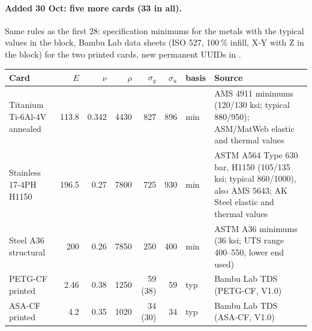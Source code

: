 \paragraph{Added 30 Oct: five more cards (33 in all).} Same rules as the first 28: specification minimums for the
metals with the typical values in the  block, Bambu Lab data sheets (ISO 527, 100\,\% infill, X-Y with
Z in the block) for the two printed cards, new permanent UUIDs in .

\begin{center}
\scriptsize
\begin{tabularx}{\linewidth}{@{}>{\raggedright\arraybackslash}p{2.75cm}rrrrrlX@{}}
\toprule
Card & $E$ & $\nu$ & $\rho$ & $\sigma_y$ & $\sigma_u$ & basis & Source\\
\midrule
Titanium Ti-6Al-4V annealed & 113.8 & 0.342 & 4430 & 827 & 896 & min & AMS 4911 minimums (120/130 ksi; typical 880/950); ASM/MatWeb elastic and thermal values\\
Stainless 17-4PH H1150 & 196.5 & 0.27 & 7800 & 725 & 930 & min & ASTM A564 Type 630 bar, H1150 (105/135 ksi; typical 860/1000), also AMS 5643; AK Steel elastic and thermal values\\
Steel A36 structural & 200 & 0.26 & 7850 & 250 & 400 & min & ASTM A36 minimums (36 ksi; UTS range 400--550, lower end used)\\
PETG-CF printed & 2.46 & 0.38 & 1250 & 59 (38) & 59 & typ & Bambu Lab TDS (PETG-CF, V1.0)\\
ASA-CF printed & 4.2 & 0.35 & 1020 & 34 (30) & 34 & typ & Bambu Lab TDS (ASA-CF, V1.0)\\
\bottomrule
\end{tabularx}
\end{center}

